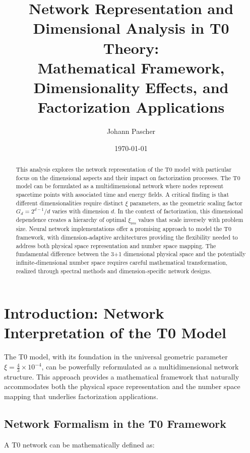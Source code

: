\documentclass[12pt,a4paper]{article}
\title{Network Representation and Dimensional Analysis in T0 Theory:\\
	\large Mathematical Framework, Dimensionality Effects, and Factorization Applications}
\author{Johann Pascher}
\date{\today}
\newcommand{\xipar}{\ensuremath{\xi}}
\newcommand{\mytimes}{\ensuremath{\times}}
\begin{document}
	
	\maketitle
	
	\begin{abstract}
		This analysis explores the network representation of the T0 model with particular focus on the dimensional aspects and their impact on factorization processes. The T0 model can be formulated as a multidimensional network where nodes represent spacetime points with associated time and energy fields. A critical finding is that different dimensionalities require distinct $\xi$ parameters, as the geometric scaling factor $G_d = 2^{d-1}/d$ varies with dimension $d$. In the context of factorization, this dimensional dependence creates a hierarchy of optimal $\xi_{\text{res}}$ values that scale inversely with problem size. Neural network implementations offer a promising approach to model the T0 framework, with dimension-adaptive architectures providing the flexibility needed to address both physical space representation and number space mapping. The fundamental difference between the 3+1 dimensional physical space and the potentially infinite-dimensional number space requires careful mathematical transformation, realized through spectral methods and dimension-specific network designs.
	\end{abstract}
	
	\tableofcontents
	\newpage
	
	\section{Introduction: Network Interpretation of the T0 Model}
	\label{sec:introduction}
	
	The T0 model, with its foundation in the universal geometric parameter $\xipar = \frac{4}{3} \mytimes 10^{-4}$, can be powerfully reformulated as a multidimensional network structure. This approach provides a mathematical framework that naturally accommodates both the physical space representation and the number space mapping that underlies factorization applications.
	
	\subsection{Network Formalism in the T0 Framework}
	\label{subsec:network_formalism}
	
	A T0 network can be mathematically defined as:
	
\end{document}
